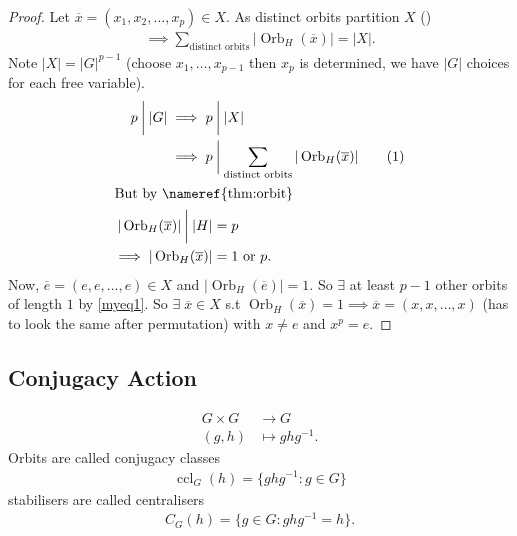 \begin{proof}
Let $\overline{x} = (x_1, x_2, \dots, x_p) \in X$.
As distinct orbits partition $X$ ()
\begin{align*}
    \implies \sum_{\text{distinct orbits}} |\operatorname{Orb}_H(\overline{x})| = |X|. 
\end{align*} 
Note $|X| = |G|^{p - 1}$ (choose $x_1, \dots, x_{p-1}$ then $x_p$ is determined, we have $|G|$ choices for each free variable).
\begin{align*}
    p \mathbin{\bigg|} |G| \implies p &\mathbin{\bigg|} |X| \\
    \implies p &\mathbin{\bigg|} \sum_{\text{distinct orbits}} |\operatorname{Orb}_H(\overline{x})| \stepcounter{equation}\tag{\theequation}\label{myeq1} \\
\intertext{But by \nameref{thm:orbit}}
    |\operatorname{Orb}_H(\overline{x})| \mathbin{\bigg|} |H| &= p \\
    \implies |\operatorname{Orb}_H(\overline{x})| &= 1 \text{ or } p.
\end{align*} 
Now, $\overline{e} = (e, e, \dots, e) \in X$ and $|\operatorname{Orb}_H(\overline{e}) | = 1$.
So $\exists$ at least $p - 1$ other orbits of length $1$ by \eqref{myeq1}.
So $\exists \; \overline{x} \in X$ s.t $\operatorname{Orb}_H(\overline{x}) = 1 \implies \overline{x} = (x, x, \dots, x)$ (has to look the same after permutation) with $x \neq e$ and $x^p = e$.
\end{proof} 

\subsection{Conjugacy Action}

\begin{align*}
    G \times G &\to G \\
    (g, h) &\mapsto g h g^{-1}.
\end{align*} 
Orbits are called conjugacy classes
\begin{align*}
    \operatorname{ccl}_G(h) = \{ g h g^{-1} : g \in G\}
\end{align*} 
stabilisers are called centralisers
\begin{align*}
    C_G(h) = \{g \in G : g h g^{-1} = h\}.
\end{align*} 

